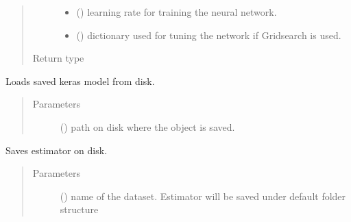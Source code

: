 \documentclass[letterpaper,10pt,english]{sphinxmanual}
\begin{document}
\begin{fulllineitems}
\begin{fulllineitems}
\begin{quote}
\begin{description}
\begin{itemize}
\item {} 
 () \textendash{} learning rate for training the neural network.

\item {} 
 () \textendash{} dictionary used for tuning the network if Gridsearch is used.

\end{itemize}

\item[{Return type}] \leavevmode
{}

\end{description}\end{quote}

\end{fulllineitems}


\begin{fulllineitems}
\label{\detokenize{estimators:mleap.estimators.nn_estimators.Deep_NN_Classifier.load}}
Loads saved keras model from disk.
\begin{quote}\begin{description}
\item[{Parameters}] \leavevmode
{} () \textendash{} path on disk where the object is saved.

\end{description}\end{quote}

\end{fulllineitems}


\begin{fulllineitems}
\label{\detokenize{estimators:mleap.estimators.nn_estimators.Deep_NN_Classifier.save}}
Saves estimator on disk.
\begin{quote}\begin{description}
\item[{Parameters}] \leavevmode
{} () \textendash{} name of the dataset. Estimator will be saved under default folder structure 

\end{description}\end{quote}

\end{fulllineitems}


\end{fulllineitems}
\end{document}
